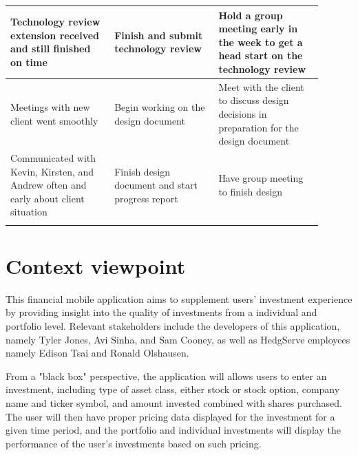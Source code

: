 \documentclass[onecolumn, draftclsnofoot,10pt, compsoc]{IEEEtran}
\begin{document}
\begin{table}[h]
\begin{tabular}{| p{0.3\linewidth} | p{0.3\linewidth} | p{0.3\linewidth} | }
                                        \hline
                                        Technology review extension received and still finished on time & Finish and submit technology review & Hold a group meeting early in the week to get a head start on the technology review\\
                                        \hline
                                        Meetings with new client went smoothly & Begin working on the design document & Meet with the client to discuss design decisions in preparation for the design document  \\
                                        \hline
                                        Communicated with Kevin, Kirsten, and Andrew often and early about client situation & Finish design document and start progress report & Have group meeting to finish design \\
                                        \hline
                                        & & \\
                                        \hline
                                        \hline
                                        \hline

                                \end{tabular}
\end{table}


\section{Context viewpoint}
        This financial mobile application aims to supplement users' investment experience by providing insight into the quality of investments from a individual and portfolio level.
        Relevant stakeholders include the developers of this application, namely Tyler Jones, Avi Sinha, and Sam Cooney, as well as HedgServe employees namely Edison Tsai and Ronald Olshausen.

        From a "black box" perspective, the application will allows users to enter an investment, including type of asset class, either stock or stock option, company name and ticker symbol,
        and amount invested combined with shares purchased. The user will then have proper pricing data displayed for the investment for a given time period, and the portfolio and individual
        investments will display the performance of the user's investments based on such pricing.
\end{document}
